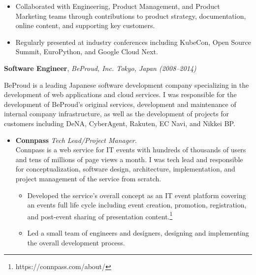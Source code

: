 \documentclass{article}
\begin{document}
\begin{list}{}{
    \setlength{\leftmargin}{0cm}	%
    \setlength{\parsep}{0.15cm}
}
\begin{itemize}
\begin{itemize}
            \item Collaborated with Engineering, Product Management, and Product
                Marketing teams through contributions to product strategy,
                documentation, online content, and supporting key customers.

            \item Regularly presented at industry conferences including
                KubeCon, Open Source Summit, EuroPython, and Google Cloud Next.

        \end{itemize}

    \end{itemize}

    \item \textbf{\large Software Engineer}, \emph{BeProud, Inc. Tokyo, Japan
        (2008--2014)}

    BeProud is a leading Japanese software development company specializing in
    the development of web applications and cloud services. I was responsible
    for the development of BeProud's original services, development and
    maintenance of internal company infrastructure, as well as the development
    of projects for customers including DeNA, CyberAgent, Rakuten, EC Navi, and
    Nikkei BP.\@

    \begin{itemize}

        \item \textbf{Connpass} \emph{Tech Lead/Project Manager.}\\
            Connpass is a web service for IT events with hundreds of thousands
            of users and tens of millions of page views a month. I was tech lead
            and responsible for conceptualization, software design,
            architecture, implementation, and project management of the service
            from scratch.

        \begin{itemize}

            \item Developed the service's overall concept as an IT event
                platform covering an events full life cycle including event
                creation, promotion, registration, and post-event sharing of
                presentation content.\footnote{https://connpass.com/about/}

            \item Led a small team of engineers and designers, designing and
                implementing the overall development process.


\end{itemize}
\end{itemize}
\end{list}
\end{document}
